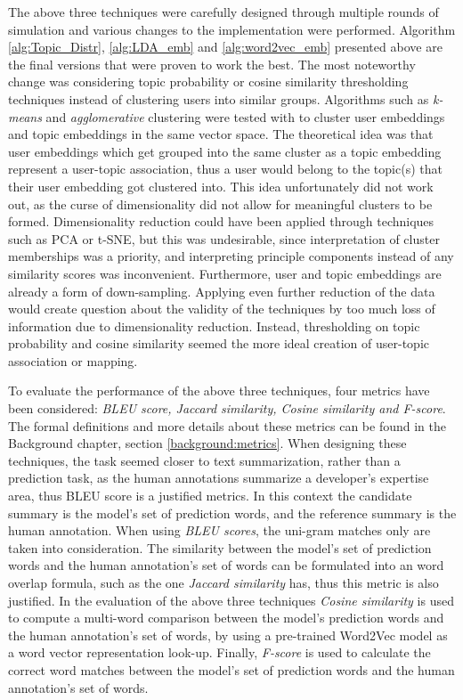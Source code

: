         The above three techniques were carefully designed through multiple rounds of simulation and various changes to the implementation were performed. Algorithm \ref{alg:Topic_Distr}, \ref{alg:LDA_emb} and \ref{alg:word2vec_emb} presented above are the final versions that were proven to work the best. The most noteworthy change was considering topic probability or cosine similarity thresholding techniques instead of clustering users into similar groups. Algorithms such as \emph{k-means} and \emph{agglomerative} clustering were tested with to cluster user embeddings and topic embeddings in the same vector space. The theoretical idea was that user embeddings which get grouped into the same cluster as a topic embedding represent a user-topic association, thus a user would belong to the topic(s) that their user embedding got clustered into. This idea unfortunately did not work out, as the curse of dimensionality did not allow for meaningful clusters to be formed. Dimensionality reduction could have been applied through techniques such as PCA or t-SNE, but this was undesirable, since interpretation of cluster memberships was a priority, and interpreting principle components instead of any similarity scores was inconvenient. Furthermore, user and topic embeddings are already a form of down-sampling. Applying even further reduction of the data would create question about the validity of the techniques by too much loss of information due to dimensionality reduction. Instead, thresholding on topic probability and cosine similarity seemed the more ideal creation of user-topic association or mapping.
        
       \label{eval_expertise_prediction} To evaluate the performance of the above three techniques, four metrics have been considered: \emph{BLEU score, Jaccard similarity, Cosine similarity and F-score}. The formal definitions and more details about these metrics can be found in the Background chapter, section \ref{background:metrics}. When designing these techniques, the task seemed closer to text summarization, rather than a prediction task, as the human annotations summarize a developer's expertise area, thus BLEU score is a justified metrics. In this context the candidate summary is the model's set of prediction words, and the reference summary is the human annotation. When using \emph{BLEU scores}, the uni-gram matches only are taken into consideration. The similarity between the model's set of prediction words and the human annotation's set of words can be formulated into an word overlap formula, such as the one \emph{Jaccard similarity} has, thus this metric is also justified. In the evaluation of the above three techniques \emph{Cosine similarity} is used to compute a multi-word comparison between the model's prediction words and the human annotation's set of words, by using a pre-trained Word2Vec model\cite{efstathiou2018word} as a word vector representation look-up. Finally, \emph{F-score} is used to calculate the correct word matches between the model's set of prediction words and the human annotation's set of words.
       
